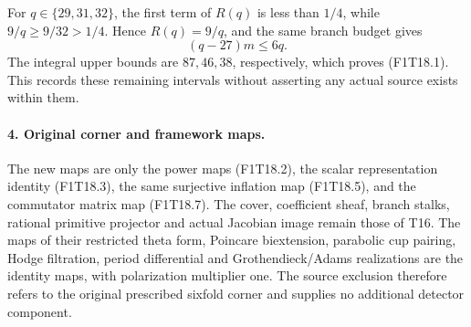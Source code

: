 For \(q\in\{29,31,32\}\), the first term of \(R(q)\)
is less than \(1/4\), while \(9/q\ge9/32>1/4\).
Hence \(R(q)=9/q\), and the same branch budget gives
\[
                 (q-27)m\le6q.
 \tag{F1T18.9}
\]
The integral upper bounds are \(87,46,38\), respectively,
which proves (F1T18.1). This records these remaining
intervals without asserting any actual source exists
within them.

\paragraph{4. Original corner and framework maps.}
The new maps are only the power maps (F1T18.2), the
scalar representation identity (F1T18.3), the same
surjective inflation map (F1T18.5), and the commutator
matrix map (F1T18.7). The cover, coefficient sheaf,
branch stalks, rational primitive projector and actual
Jacobian image remain those of T16. The maps of their
restricted theta form, Poincare biextension, parabolic
cup pairing, Hodge filtration, period differential and
Grothendieck/Adams realizations are the identity maps,
with polarization multiplier one. The source exclusion
therefore refers to the original prescribed sixfold
corner and supplies no additional detector component.
